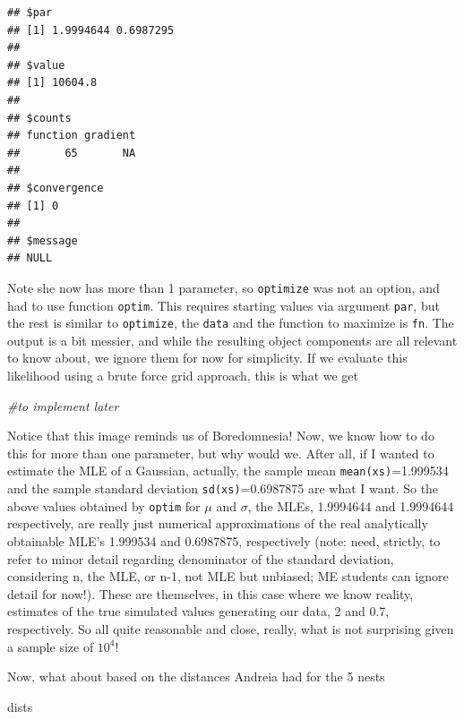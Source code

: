 \documentclass[
]{book}
\newenvironment{Shaded}{\begin{snugshade}}{\end{snugshade}}
\newcommand{\CommentTok}[1]{\textcolor[rgb]{0.56,0.35,0.01}{\textit{#1}}}
\newcommand{\NormalTok}[1]{#1}
\begin{document}
\begin{verbatim}
## $par
## [1] 1.9994644 0.6987295
## 
## $value
## [1] 10604.8
## 
## $counts
## function gradient 
##       65       NA 
## 
## $convergence
## [1] 0
## 
## $message
## NULL
\end{verbatim}

Note she now has more than 1 parameter, so \texttt{optimize} was not an option, and had to use function \texttt{optim}. This requires starting values via argument \texttt{par}, but the rest is similar to \texttt{optimize}, the \texttt{data} and the function to maximize is \texttt{fn}. The output is a bit messier, and while the resulting object components are all relevant to know about, we ignore them for now for simplicity. If we evaluate this likelihood using a brute force grid approach, this is what we get

\begin{Shaded}
\begin{Highlighting}[]
\CommentTok{\#to implement later}
\end{Highlighting}
\end{Shaded}

Notice that this image reminds us of Boredomnesia! Now, we know how to do this for more than one parameter, but why would we. After all, if I wanted to estimate the MLE of a Gaussian, actually, the sample mean \texttt{mean(xs)}=1.999534 and the sample standard deviation \texttt{sd(xs)}=0.6987875 are what I want. So the above values obtained by \texttt{optim} for \(\mu\) and \(\sigma\), the MLEs, 1.9994644 and 1.9994644 respectively, are really just numerical approximations of the real analytically obtainable MLE's 1.999534 and 0.6987875, respectively (note: need, strictly, to refer to minor detail regarding denominator of the standard deviation, considering n, the MLE, or n-1, not MLE but unbiased; ME students can ignore detail for now!). These are themselves, in this case where we know reality, estimates of the true simulated values generating our data, 2 and 0.7, respectively. So all quite reasonable and close, really, what is not surprising given a sample size of \ensuremath{10^{4}}!

Now, what about based on the distances Andreia had for the 5 nests

\begin{Shaded}
\begin{Highlighting}[]
\NormalTok{dists}
\end{Highlighting}
\end{Shaded}
\end{document}
